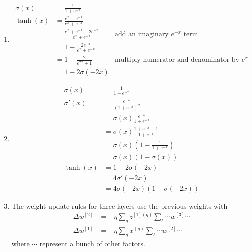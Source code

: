\begin{enumerate}
	\item
	      \begin{align*}
		      \sigma(x) & = \frac{1}{1 + e^{-x}}                                                                            \\
		      \tanh(x)  & = \frac{e^{x} - e^{-x}}{e^x + e^{-x}}                                                             \\
		                & = \frac{e^x + e^{-x} - 2e^{-x}}{e^x + e^{-x}} & \text{add an imaginary } e^{-x} \text{ term}      \\
		                & = 1 - \frac{2e^{-x}}{e^x + e^{-x}}                                                                \\
		                & = 1 - \frac{2}{e^{2x} + 1}                    & \text{multiply numerator and denominator by } e^x \\
		                & = 1 - 2\sigma(-2x)
	      \end{align*}

	\item
	      \begin{align*}
		      \sigma(x)  & = \frac{1}{1 + e^{-x}}                            \\
		      \sigma'(x) & = \frac{e^{-x}}{(1 + e^{-x})^2}                   \\
		                 & = \sigma(x) \frac{e^{-x}}{1 + e^{-x}}             \\
		                 & = \sigma(x) \frac{1 + e^{-x} - 1}{1 + e^{-x}}     \\
		                 & = \sigma(x) \left(1 - \frac{1}{1 + e^{-x}}\right) \\
		                 & = \sigma(x) (1 - \sigma(x))                       \\
		      \tanh(x)   & = 1 - 2\sigma(-2x)                                \\
		                 & = 4\sigma'(-2x)                                   \\
		                 & = 4\sigma(-2x)(1 - \sigma(-2x))
	      \end{align*}

	\item
	      The weight update rules for three layers use the previous weights with
	      \begin{align*}
		      \Delta w^{[2]} & = -\eta \sum_q z^{[1](q)} \sum_\ell \cdots w^{[3]} \cdots \\
		      \Delta w^{[1]} & = -\eta \sum_q x^{(q)} \sum_\ell \cdots w^{[2]} \cdots
	      \end{align*}
	      where $\cdots$ represent a bunch of other factors.


\end{enumerate}
